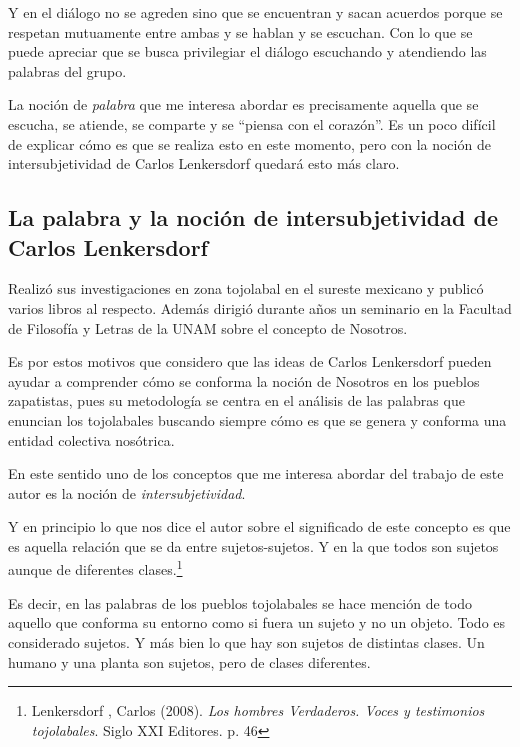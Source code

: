 \documentclass[oneside]{book}
\begin{document}
Y en el diálogo no se agreden sino que se encuentran y sacan acuerdos porque se respetan mutuamente entre ambas y se hablan y se escuchan. Con lo que se puede apreciar que se busca privilegiar el diálogo escuchando y atendiendo las palabras del grupo.

La noción de \textit{palabra} que me interesa abordar es precisamente aquella que se escucha, se atiende, se comparte y se “piensa con el corazón”. Es un poco difícil de explicar cómo es que se realiza esto en este momento, pero con la noción de intersubjetividad de Carlos Lenkersdorf quedará esto más claro.

\subsection{La palabra y la noción de intersubjetividad de Carlos Lenkersdorf}

Realizó sus investigaciones en zona tojolabal en el sureste mexicano y publicó varios libros al respecto. Además dirigió durante años un seminario en la Facultad de Filosofía y Letras de la UNAM sobre el concepto de Nosotros.

Es por estos motivos que considero que las ideas de Carlos Lenkersdorf pueden ayudar a comprender cómo se conforma la noción de Nosotros en los pueblos zapatistas, pues su metodología se centra en el análisis de las palabras que enuncian los tojolabales buscando siempre cómo es que se genera y conforma una entidad colectiva nosótrica. 

En este sentido uno de los conceptos que me interesa abordar del trabajo de este autor es la noción de \textit{intersubjetividad}.

Y en principio lo que nos dice el autor sobre el significado de este concepto es que es aquella relación que se da entre sujetos-sujetos. Y en la que todos son sujetos aunque de diferentes clases.\footnote{Lenkersdorf , Carlos (2008). \textit{Los hombres Verdaderos. Voces y testimonios tojolabales}. Siglo XXI Editores. p. 46}

Es decir, en las palabras de los pueblos tojolabales se hace mención de todo aquello que conforma su entorno como si fuera un sujeto y no un  objeto. Todo es considerado sujetos. Y más bien lo que hay son sujetos de distintas clases. Un humano y una planta son sujetos, pero de clases diferentes.
\end{document}
